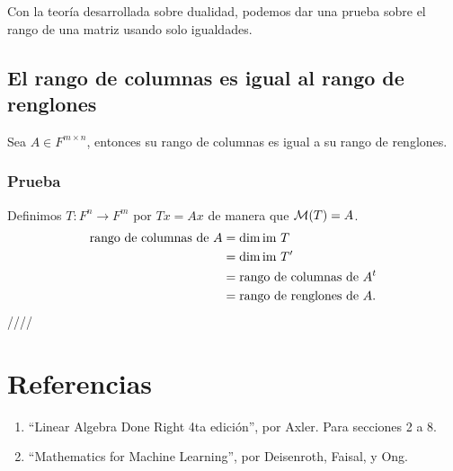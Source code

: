 \documentclass{article}
\begin{document}
Con la teoría desarrollada sobre dualidad, podemos dar una prueba
sobre el rango de una matriz usando solo igualdades.
\subsection{El rango de columnas es igual al rango de renglones}
Sea $A\in F^{m\times n}$, entonces su rango de columnas es
igual a su rango de renglones.
\subsubsection*{Prueba}
Definimos $T: F^n\rightarrow F^m$ por $Tx=Ax$ de manera que
$\mathcal{M}(T)=A$.
\begin{align*}
    \text{rango de columnas de $A$} &= \dim\text{im } T\\
    &= \dim\text{im } T'\\
    &= \text{rango de columnas de $A^t$}\\
    &= \text{rango de renglones de $A$}.
\end{align*}
\hfill ////
\newpage


\newpage
\section*{Referencias}
\begin{enumerate}
    \item ``Linear Algebra Done Right 4ta edición'', por Axler. Para secciones 2 a 8.
    \item ``Mathematics for Machine Learning'', por Deisenroth, Faisal, y Ong.
\end{enumerate}
\end{document}
